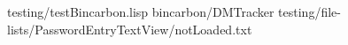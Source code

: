 testing/testBincarbon.lisp
bincarbon/DMTracker
testing/file-lists/PasswordEntryTextView/notLoaded.txt
